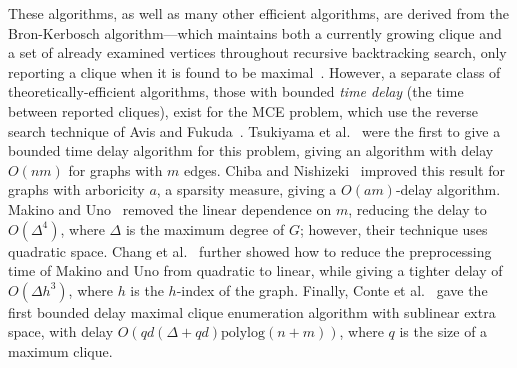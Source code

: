 \documentclass[final,1p]{elsarticle-modified}
\newcommand{\polylog}{\ensuremath{\mathrm{polylog}}}
\begin{document}
These algorithms, as well as many other efficient algorithms, are derived from the Bron-Kerbosch algorithm---which maintains both a currently growing clique and a set of already examined vertices throughout recursive backtracking search, only reporting a clique when it is found to be maximal~\cite{bron-kerbosch-73}. However, a separate class of theoretically-efficient algorithms, those with bounded \emph{time delay} (the time between reported cliques), exist for the MCE problem, which use the reverse search technique of Avis and Fukuda~\cite{avis-1996}. Tsukiyama et al.~\cite{tsukiyama-77} were the first to give a bounded time delay algorithm for this problem, giving an algorithm with delay $O(nm)$ for graphs with $m$ edges. Chiba and Nishizeki~\cite{chiba-nishizeki-1985} improved this result for graphs with arboricity $a$, a sparsity measure, giving a $O(am)$-delay algorithm. Makino and Uno~\cite{makino-uno-2004} removed the linear dependence on $m$, reducing the delay to $O(\Delta^4)$, where $\Delta$ is the maximum degree of $G$; however, their technique uses quadratic space. Chang et al.~\cite{chang-h-index} further showed how to reduce the preprocessing time of Makino and Uno from quadratic to linear, while giving a tighter delay of $O(\Delta h^3)$, where $h$ is the $h$-index of the graph. Finally, Conte et al.~\cite{conte-2016} gave the first bounded delay maximal clique enumeration algorithm with sublinear extra space, with delay $O(qd(\Delta + qd)\polylog(n+m))$, where $q$ is the size of a maximum clique.

\end{document}
